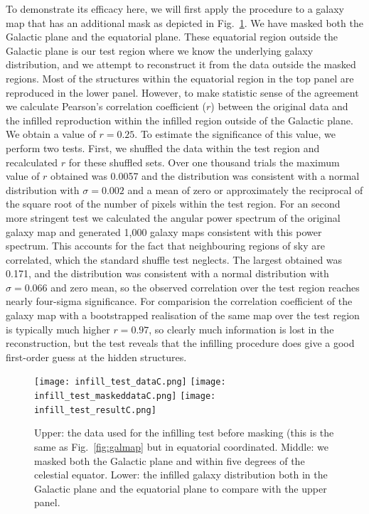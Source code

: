 \documentclass[useAMS,usenatbib]{mn2e}
\begin{document}
To demonstrate its efficacy here, we will first apply the procedure to
a galaxy map that has an additional mask as depicted in
Fig.~\ref{fig:infilling_test}.  We have masked both the Galactic plane
and the equatorial plane.  These equatorial region outside the
Galactic plane is our test region where we know the underlying galaxy
distribution, and we attempt to reconstruct it from the data outside
the masked regions.  Most of the structures within the equatorial
region in the top panel are reproduced in the lower panel.  However,
to make statistic sense of the agreement we calculate Pearson's
correlation coefficient ($r$) between the original data and the
infilled reproduction within the infilled region outside of the
Galactic plane.  We obtain a value of $r=0.25$.  To estimate the
significance of this value, we perform two tests.  First, we shuffled
the data within the test region and recalculated $r$ for these
shuffled sets.  Over one thousand trials the maximum value of $r$
obtained was 0.0057 and the distribution was consistent with a normal
distribution with $\sigma=0.002$ and a mean of zero or approximately
the reciprocal of the square root of the number of pixels within the
test region.  For an second more stringent test we calculated the
angular power spectrum of the original galaxy map and generated 1,000
galaxy maps consistent with this power spectrum.  This accounts for
the fact that neighbouring regions of sky are correlated, which the
standard shuffle test neglects.  The largest obtained was 0.171, and
the distribution was consistent with a normal distribution with
$\sigma=0.066$ and zero mean, so the observed correlation over the
test region reaches nearly four-sigma significance.  For comparision
the correlation coefficient of the galaxy map with a bootstrapped
realisation of the same map over the test region is typically much
higher $r=0.97$, so clearly much information is lost in the
reconstruction, but the test reveals that the infilling procedure does
give a good first-order guess at the hidden structures.
\begin{figure}
  \texttt{[image: infill\_test\_dataC.png]}
  \texttt{[image: infill\_test\_maskeddataC.png]}
  \texttt{[image: infill\_test\_resultC.png]}
  \caption{Upper: the data used for the infilling test before masking
    (this is the same as Fig.~\ref{fig:galmap} but in equatorial
    coordinated.  Middle: we masked both the Galactic plane and within
    five degrees of the celestial equator.  Lower: the infilled galaxy
    distribution both in the Galactic plane and the equatorial plane
    to compare with the upper panel.}
  \label{fig:infilling_test}
\end{figure}
\end{document}
